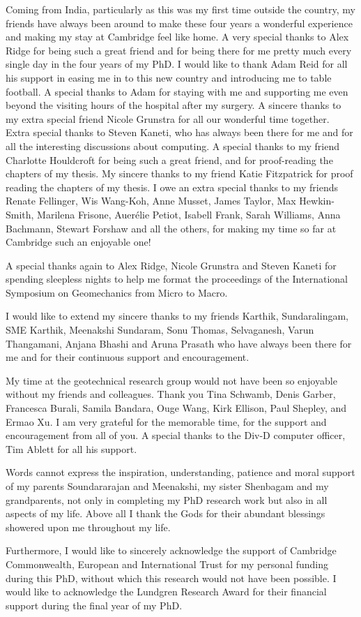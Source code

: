 \begin{acknowledgements}
Coming from India, particularly as this was my first time outside the country, 
my friends have always been around to make these four years a wonderful 
experience and making my stay at Cambridge feel like home. A very special 
thanks to Alex Ridge for being such a great friend 
and for being there for me pretty much every single day in the four years of my
PhD. I would like to thank Adam Reid for all his support in easing me in to 
this new country and introducing me to table football. A special thanks to Adam 
for staying with me and supporting me even beyond the visiting hours of the 
hospital after my surgery. A sincere thanks to my extra special friend Nicole 
Grunstra for all our wonderful time together. Extra special thanks to Steven 
Kaneti, who has always been there for me and for all the interesting 
discussions about computing. A special thanks to my friend Charlotte Houldcroft 
for being such a great friend, and for proof-reading the chapters of my thesis. 
My sincere thanks to my friend Katie Fitzpatrick for proof reading the chapters 
of my thesis. I owe an extra special thanks to my friends Renate Fellinger,
Wis Wang-Koh, Anne Musset, James Taylor, Max Hewkin-Smith, Marilena Frisone, 
Auer\'{e}lie Petiot, Isabell Frank, Sarah Williams, Anna Bachmann, Stewart 
Forshaw and all the others, for making my time so far at Cambridge such an 
enjoyable one!

A special thanks again to Alex Ridge, Nicole Grunstra and Steven Kaneti for 
spending sleepless nights to help me format the proceedings of the 
International Symposium on Geomechanics from Micro to Macro. 

I would like to extend my sincere thanks to my friends Karthik, 
Sundaralingam, SME Karthik, Meenakshi Sundaram, Sonu Thomas, Selvaganesh, Varun 
Thangamani, Anjana Bhashi and Aruna Prasath who have always been there for 
me and for their continuous support and encouragement.

My time at the geotechnical research group would not have been so enjoyable 
without my friends and colleagues. Thank you Tina Schwamb, Denis Garber,
Francesca Burali, Samila Bandara, Ouge Wang, Kirk Ellison, Paul 
Shepley, and Ermao Xu. I am very grateful for the memorable time, 
for the support and encouragement from all of you. A special thanks to the 
Div-D computer officer, Tim Ablett for all his support.

Words cannot express the inspiration, understanding, patience and moral support 
of my parents Soundararajan and Meenakshi, my sister Shenbagam and my 
grandparents, not only in completing my PhD research work but also in all 
aspects of my life. Above all I thank the Gods for their abundant blessings 
showered upon me throughout my life.

Furthermore, I would like to sincerely acknowledge the support of Cambridge 
Commonwealth, European and International Trust for my personal funding during 
this PhD, without which this research would not have been possible. I would 
like to acknowledge the Lundgren Research Award for their financial support 
during the final year of my PhD.

\end{acknowledgements}
